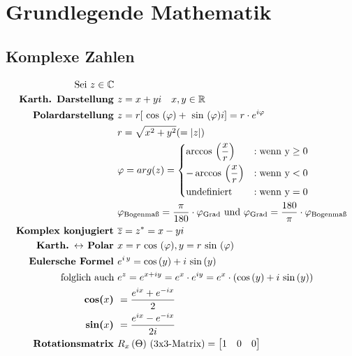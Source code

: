 \documentclass[8pt]{article}
\begin{document}
	\section{Grundlegende Mathematik}
		\subsection{Komplexe Zahlen}
			\begin{align*}
				\text{Sei }z \in \mathbb{C} \text{ }	& \\
				\textbf{Karth. Darstellung } 			& z = x + yi \quad x, y \in \mathbb{R} \\
				\textbf{Polardarstellung } 				& z = r [ \text{ cos }(\varphi) + \text{ sin }(\varphi)i ] = r \cdot e^{i \varphi} \\
														& r = \sqrt{x^2 + y^2} (= |z|) \\
														& \varphi = arg(z) = 
														\begin{dcases}
															\arccos{}\left(\frac{x}{r}\right) 	& : \text{wenn y} \geq 0\\
															-\arccos{}\left(\frac{x}{r}\right) 	& : \text{wenn y} < 0\\
															\text{undefiniert} 					& : \text{wenn y} = 0\\
														\end{dcases}\\
														& \varphi_\text{Bogenmaß} = \frac{\pi}{180} \cdot \varphi_\text{Grad} \text{ und } \varphi_\text{Grad} = \frac{180}{\pi} \cdot \varphi_\text{Bogenmaß}\\
				\textbf{Komplex konjugiert } 			& \overline{z} = z^{*} = x - yi \\
				\textbf{Karth. $\leftrightarrow$ Polar }& x = r \text{ cos }(\varphi), y = r \text{ sin }(\varphi) \\
				\textbf{Eulersche Formel } 				& {{e} ^{{i} \,y}=\cos \left(y\right)+ {i} \,\sin \left(y\right)}\\
				\text{folglich auch }  					& {{e} ^{z}= {e} ^{x+{i} y}= {e} ^{x}\cdot {e} ^{ {i} y}= {e} ^{x}\cdot \left(\cos \left(y\right)+{i} \,\sin \left(y\right)\right)}\\
				\textbf{cos($x$) } 						& = \frac{e^{i x} + e^{-i x}}{2}\\
				\textbf{sin($x$) } 						& = \frac{e^{i x} - e^{-i x}}{2i}\\
				\textbf{Rotationsmatrix }				& \text{$R_x\left(\Theta\right)$ (3x3-Matrix)} = \begin{bmatrix}1 & 0 & 0 \\

\end{bmatrix}
\end{align*}
\end{document}
